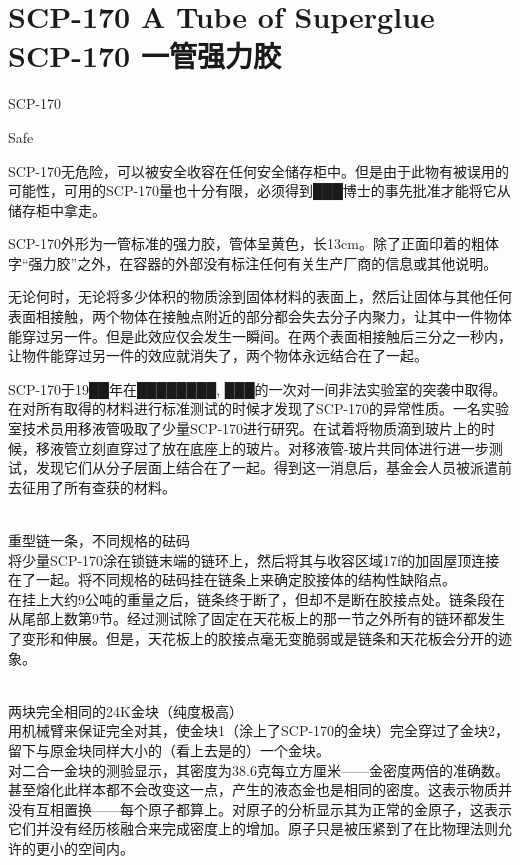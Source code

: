 \chapter[SCP-170 一管强力胶]{
    SCP-170 A Tube of Superglue\\
    SCP-170 一管强力胶
}

\label{chap:SCP-170}

SCP-170

Safe

SCP-170无危险，可以被安全收容在任何安全储存柜中。但是由于此物有被误用的可能性，可用的SCP-170量也十分有限，必须得到███博士的事先批准才能将它从储存柜中拿走。

SCP-170外形为一管标准的强力胶，管体呈黄色，长13cm。除了正面印着的粗体字“强力胶”之外，在容器的外部没有标注任何有关生产厂商的信息或其他说明。

无论何时，无论将多少体积的物质涂到固体材料的表面上，然后让固体与其他任何表面相接触，两个物体在接触点附近的部分都会失去分子内聚力，让其中一件物体能穿过另一件。但是此效应仅会发生一瞬间。在两个表面相接触后三分之一秒内，让物件能穿过另一件的效应就消失了，两个物体永远结合在了一起。

SCP-170于19██年在████████, ███的一次对一间非法实验室的突袭中取得。在对所有取得的材料进行标准测试的时候才发现了SCP-170的异常性质。一名实验室技术员用移液管吸取了少量SCP-170进行研究。在试着将物质滴到玻片上的时候，移液管立刻直穿过了放在底座上的玻片。对移液管-玻片共同体进行进一步测试，发现它们从分子层面上结合在了一起。得到这一消息后，基金会人员被派遣前去征用了所有查获的材料。

\hr


\\
重型链一条，不同规格的砝码\\
将少量SCP-170涂在锁链末端的链环上，然后将其与收容区域17f的加固屋顶连接在了一起。将不同规格的砝码挂在链条上来确定胶接体的结构性缺陷点。\\
在挂上大约9公吨的重量之后，链条终于断了，但却不是断在胶接点处。链条段在从尾部上数第9节。经过测试除了固定在天花板上的那一节之外所有的链环都发生了变形和伸展。但是，天花板上的胶接点毫无变脆弱或是链条和天花板会分开的迹象。

\\
两块完全相同的24K金块（纯度极高）\\
用机械臂来保证完全对其，使金块1（涂上了SCP-170的金块）完全穿过了金块2，留下与原金块同样大小的（看上去是的）一个金块。\\
对二合一金块的测验显示，其密度为38.6克每立方厘米——金密度两倍的准确数。甚至熔化此样本都不会改变这一点，产生的液态金也是相同的密度。这表示物质并没有互相置换——每个原子都算上。对原子的分析显示其为正常的金原子，这表示它们并没有经历核融合来完成密度上的增加。原子只是被压紧到了在比物理法则允许的更小的空间内。

